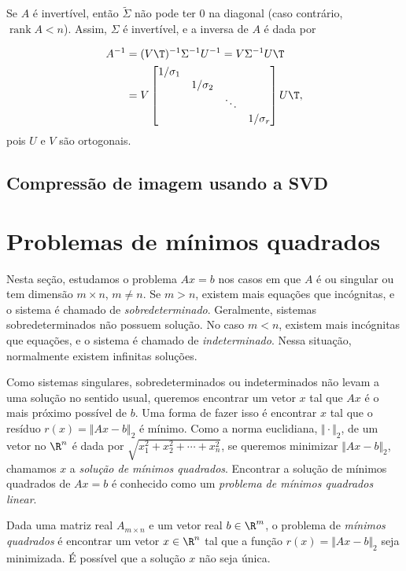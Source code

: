 \documentclass{article}
\DeclareMathOperator{\rank}{rank}
\begin{document}
Se \(A\) é invertível, então \(\tilde{\Sigma}\) não pode ter \(0\) na diagonal (caso contrário, \(\rank A < n\)). Assim, \(\Sigma\) é invertível, e a inversa de \(A\) é dada por

\begin{align}
    A^{-1} &= (V\T )^{-1} \Sigma^{-1} U^{-1} = V \Sigma^{-1} U\T  \\
    &= V \begin{bmatrix}
        1/\sigma_1 & & & \\
        & 1/\sigma_2 & & \\
        & & \ddots & \\
        & & & 1/\sigma_r
    \end{bmatrix} U\T ,
\end{align} pois \(U\) e \(V\) são ortogonais.

\subsection{Compressão de imagem usando a SVD}

\section{Problemas de mínimos quadrados}

Nesta seção, estudamos o problema \(Ax=b\) nos casos em que \(A\) é ou singular ou tem dimensão \(m \times n\), \(m \neq n\). Se \(m > n\), existem mais equações que incógnitas, e o sistema é chamado de \emph{sobredeterminado}. Geralmente, sistemas sobredeterminados não possuem solução. No caso \(m < n\), existem mais incógnitas que equações, e o sistema é chamado de \emph{indeterminado}. Nessa situação, normalmente existem infinitas soluções.

Como sistemas singulares, sobredeterminados ou indeterminados não levam a uma solução no sentido usual, queremos encontrar um vetor \(x\) tal que \(Ax\) é o mais próximo possível de \(b\). Uma forma de fazer isso é encontrar \(x\) tal que o resíduo \(r(x) = \Vert Ax - b \Vert_2\) é mínimo. Como a norma euclidiana, \(\Vert \cdot \Vert_2\), de um vetor no \(\R^n\) é dada por \(\sqrt{x_1^2 + x_2^2 + \cdots + x_n^2}\), se queremos minimizar \(\Vert Ax - b \Vert_2\), chamamos \(x\) a \emph{solução de mínimos quadrados}. Encontrar a solução de mínimos quadrados de \(Ax=b\) é conhecido como um \emph{problema de mínimos quadrados linear}.

\begin{defn}
    Dada uma matriz real \(A_{m \times n}\) e um vetor real \(b \in \R^m\), o problema de \emph{mínimos quadrados} é encontrar um vetor \(x \in \R^n\) tal que a função \(r(x) = \Vert Ax - b \Vert_2\) seja minimizada. É possível que a solução \(x\) não seja única.
\end{defn}
\end{document}
